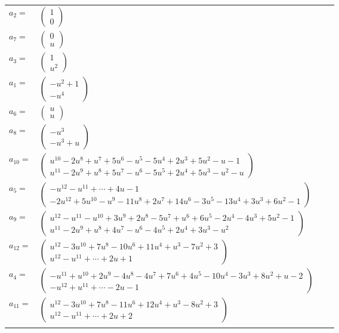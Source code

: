 \documentclass[1p]{elsarticle_modified}
\theoremstyle{definition}
\begin{document}
\begin{tabular}{m{7pt} m{180pt} m{7pt} m{180pt} }
\flushright $a_{2}=$&$\begin{pmatrix}1\\0\end{pmatrix}$ \\
\flushright $a_{7}=$&$\begin{pmatrix}0\\u\end{pmatrix}$ \\
\flushright $a_{3}=$&$\begin{pmatrix}1\\u^2\end{pmatrix}$ \\
\flushright $a_{1}=$&$\begin{pmatrix}- u^2+1\\- u^4\end{pmatrix}$ \\
\flushright $a_{6}=$&$\begin{pmatrix}u\\u\end{pmatrix}$ \\
\flushright $a_{8}=$&$\begin{pmatrix}- u^3\\- u^3+u\end{pmatrix}$ \\
\flushright $a_{10}=$&$\begin{pmatrix}u^{10}-2 u^8+u^7+5 u^6- u^5-5 u^4+2 u^3+5 u^2- u-1\\u^{11}-2 u^9+u^8+5 u^7- u^6-5 u^5+2 u^4+5 u^3- u^2- u\end{pmatrix}$ \\
\flushright $a_{5}=$&$\begin{pmatrix}- u^{12}- u^{11}+\cdots+4 u-1\\-2 u^{12}+5 u^{10}- u^9-11 u^8+2 u^7+14 u^6-3 u^5-13 u^4+3 u^3+6 u^2-1\end{pmatrix}$ \\
\flushright $a_{9}=$&$\begin{pmatrix}u^{12}- u^{11}- u^{10}+3 u^9+2 u^8-5 u^7+u^6+6 u^5-2 u^4-4 u^3+5 u^2-1\\u^{11}-2 u^9+u^8+4 u^7- u^6-4 u^5+2 u^4+3 u^3- u^2\end{pmatrix}$ \\
\flushright $a_{12}=$&$\begin{pmatrix}u^{12}-3 u^{10}+7 u^8-10 u^6+11 u^4+u^3-7 u^2+3\\u^{12}- u^{11}+\cdots+2 u+1\end{pmatrix}$ \\
\flushright $a_{4}=$&$\begin{pmatrix}- u^{11}+u^{10}+2 u^9-4 u^8-4 u^7+7 u^6+4 u^5-10 u^4-3 u^3+8 u^2+u-2\\- u^{12}+u^{11}+\cdots-2 u-1\end{pmatrix}$ \\
\flushright $a_{11}=$&$\begin{pmatrix}u^{12}-3 u^{10}+7 u^8-11 u^6+12 u^4+u^3-8 u^2+3\\u^{12}- u^{11}+\cdots+2 u+2\end{pmatrix}$\\&\end{tabular}
\end{document}

